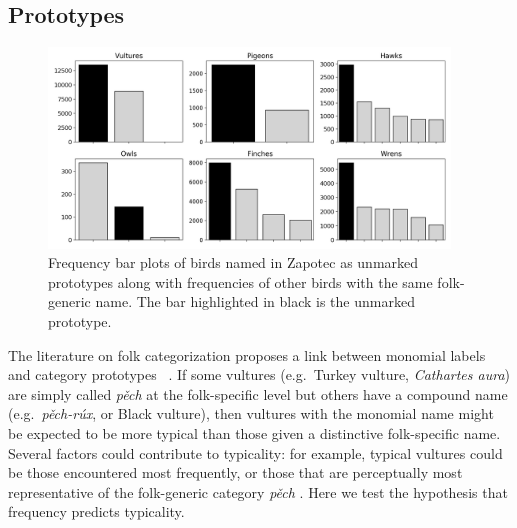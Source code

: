 \documentclass[10pt,letterpaper]{article}
\begin{document}
\subsection{Prototypes}

\begin{figure}[ht!]
  \begin{center}
    \includegraphics[width=0.95\textwidth]{./figures/prototypes-barplots-all.png}
    \vspace{-0.05in}
        \caption{Frequency bar plots of birds named in Zapotec as unmarked prototypes along with frequencies of other birds with the same folk-generic name. The bar highlighted in black is the unmarked prototype.}
        \label{fig-freq-prototype-all}
  \end{center}
\end{figure}

The literature on folk categorization proposes a link between monomial labels and category prototypes
~\cite{berlin1972speculations,berlin2014ethnobiological}. If some vultures (e.g.\ Turkey vulture, \emph{ Cathartes aura}) are simply called \textit{p\v{e}ch} at the folk-specific level but others have a compound name (e.g.\ \textit{p\v{e}ch-r\'{u}x}, or Black vulture), then vultures with the monomial name might be expected to be more typical than those given a distinctive folk-specific name. Several factors could contribute to typicality: for example, typical vultures could be those encountered most frequently, or those that are perceptually most representative of the folk-generic category 
\textit{p\v{e}ch} \cite{berlin2014ethnobiological}.  Here we test the hypothesis that frequency predicts typicality.
\end{document}
